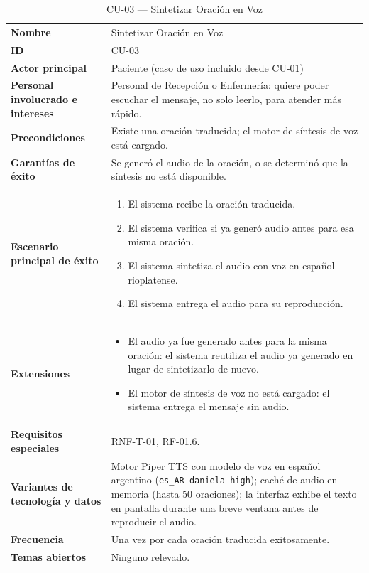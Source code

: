 \begin{longtable}{@{}>{\raggedright\arraybackslash}p{4.1cm} >{\raggedright\arraybackslash}p{\dimexpr\textwidth-4.1cm-2\tabcolsep\relax}@{}}
\caption{CU-03 --- Sintetizar Oración en Voz}\\
\toprule
\textbf{Nombre} & Sintetizar Oración en Voz \\
\textbf{ID} & CU-03 \\
\textbf{Actor principal} & Paciente (caso de uso incluido desde CU-01) \\
\textbf{Personal involucrado e intereses} &
Personal de Recepción o Enfermería: quiere poder escuchar el mensaje, no
solo leerlo, para atender más rápido. \\
\textbf{Precondiciones} &
Existe una oración traducida; el motor de síntesis de voz está cargado. \\
\textbf{Garantías de éxito} &
Se generó el audio de la oración, o se determinó que la síntesis no está
disponible. \\
\textbf{Escenario principal de éxito} &
\begin{enumerate}[leftmargin=*, itemsep=2pt]
    \item El sistema recibe la oración traducida.
    \item El sistema verifica si ya generó audio antes para esa misma
    oración.
    \item El sistema sintetiza el audio con voz en español rioplatense.
    \item El sistema entrega el audio para su reproducción.
\end{enumerate} \\
\textbf{Extensiones} &
\begin{itemize}[leftmargin=*, itemsep=2pt]
    \item[2a.] El audio ya fue generado antes para la misma oración: el
    sistema reutiliza el audio ya generado en lugar de sintetizarlo de
    nuevo.
    \item[3a.] El motor de síntesis de voz no está cargado: el sistema
    entrega el mensaje sin audio.
\end{itemize} \\
\textbf{Requisitos especiales} & RNF-T-01, RF-01.6. \\
\textbf{Variantes de tecnología y datos} &
Motor Piper TTS con modelo de voz en español argentino
(\texttt{es\_AR-daniela-high}); caché de audio en memoria (hasta 50
oraciones); la interfaz exhibe el texto en pantalla durante una breve
ventana antes de reproducir el audio. \\
\textbf{Frecuencia} & Una vez por cada oración traducida exitosamente. \\
\textbf{Temas abiertos} & Ninguno relevado. \\
\bottomrule
\end{longtable}

